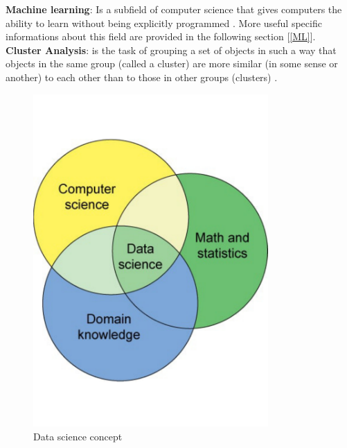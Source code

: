 \begin{minipage}{0.5\textwidth}
\textbf{Machine learning}: Is a subfield of computer science that gives computers the ability to learn without being explicitly programmed \cite{ArthurSamuel}. More useful specific informations about this field are provided in the following section [\ref{ML}].\\

\textbf{Cluster Analysis}: is the task of grouping a set of objects in such a way that objects in the same group (called a cluster) are more similar (in some sense or another) to each other than to those in other groups (clusters) \cite{wiki:clusterAnalysis}. \\ 


\end{minipage} \hfill
\begin{minipage}{0.50\textwidth}
\begin{figure}[H]
	\centering
    \includegraphics[trim={0 3cm 0 4cm},clip,width=0.8\textwidth]{Files/Data_Science_Concept.pdf}
    \caption{Data science concept}
    \label{fig: Data_science}
\end{figure}
\end{minipage}


